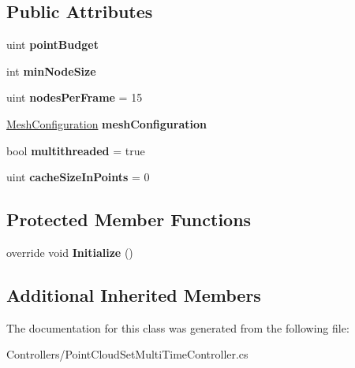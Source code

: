 \subsection*{Public Attributes}
\begin{DoxyCompactItemize}
\item 
\mbox{\label{class_controllers_1_1_point_cloud_set_multi_time_controller_a645044db6bfd8f471e92324429676fc8}} 
uint {\bfseries point\+Budget}
\item 
\mbox{\label{class_controllers_1_1_point_cloud_set_multi_time_controller_adbd6ce51c56a5a12dd9e64263287335e}} 
int {\bfseries min\+Node\+Size}
\item 
\mbox{\label{class_controllers_1_1_point_cloud_set_multi_time_controller_a9936cdc4a0ab3bdedc96856631d52224}} 
uint {\bfseries nodes\+Per\+Frame} = 15
\item 
\mbox{\label{class_controllers_1_1_point_cloud_set_multi_time_controller_a6fd1ae91dff4c3735195caa4d3f7ea43}} 
\hyperlink{class_object_creation_1_1_mesh_configuration}{Mesh\+Configuration} {\bfseries mesh\+Configuration}
\item 
\mbox{\label{class_controllers_1_1_point_cloud_set_multi_time_controller_a41371a0c5548dce88c52b6005e77015f}} 
bool {\bfseries multithreaded} = true
\item 
\mbox{\label{class_controllers_1_1_point_cloud_set_multi_time_controller_ab4767a6ab9bc35316f03fa94f3eca6cc}} 
uint {\bfseries cache\+Size\+In\+Points} = 0
\end{DoxyCompactItemize}
\subsection*{Protected Member Functions}
\begin{DoxyCompactItemize}
\item 
\mbox{\label{class_controllers_1_1_point_cloud_set_multi_time_controller_ada6df0cc7f76cb03cc1d2cbd948c8e9e}} 
override void {\bfseries Initialize} ()
\end{DoxyCompactItemize}
\subsection*{Additional Inherited Members}


The documentation for this class was generated from the following file\+:\begin{DoxyCompactItemize}
\item 
Controllers/Point\+Cloud\+Set\+Multi\+Time\+Controller.\+cs\end{DoxyCompactItemize}
